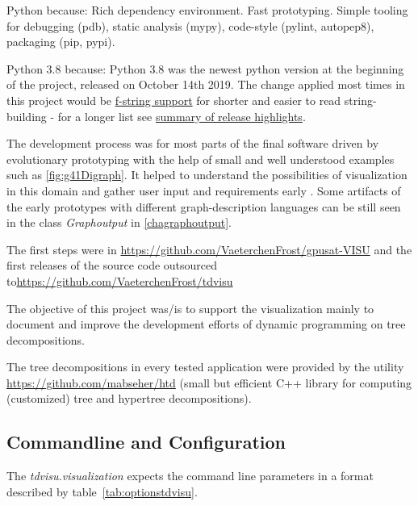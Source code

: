 \documentclass[a4paper, 12pt]{scrartcl}
\begin{document}
Python because: Rich dependency environment. Fast prototyping. Simple tooling for debugging (pdb), static analysis (mypy), code-style (pylint, autopep8), packaging (pip, pypi).

Python 3.8 because: Python 3.8 was the newest python version at the beginning of the project, released on October 14th 2019. The change applied most times in this project would be \href{https://docs.python.org/3/whatsnew/3.8.html#f-strings-support-for-self-documenting-expressions-and-debugging}{f-string support} for shorter and easier to read string-building - for a longer list see \href{https://docs.python.org/3/whatsnew/3.8.html}{summary of release highlights}.

The development process was for most parts of the final software driven by evolutionary prototyping with the help of small and well understood examples such as \ref{fig:g41Digraph}. It helped to understand the possibilities of visualization in this domain and gather user input and requirements early \cite{rapidPrototypingOvermyer}. Some artifacts of the early prototypes with different graph-description languages can be still seen in the class \textit{Graphoutput} in \ref{chagraphoutput}.

The first steps were in \url{https://github.com/VaeterchenFrost/gpusat-VISU} and the first releases of the source code outsourced to\url{https://github.com/VaeterchenFrost/tdvisu}

The objective of this project was/is to support the visualization mainly to document and improve the development efforts of dynamic programming on tree decompositions.

The tree decompositions in every tested application were provided by the utility \url{https://github.com/mabseher/htd} (small but efficient C++ library for computing (customized) tree and hypertree decompositions).



\subsection{Commandline and Configuration}


The \textit{tdvisu.visualization} expects the command line parameters in a format described by table~\ref{tab:optionstdvisu}.
\end{document}
